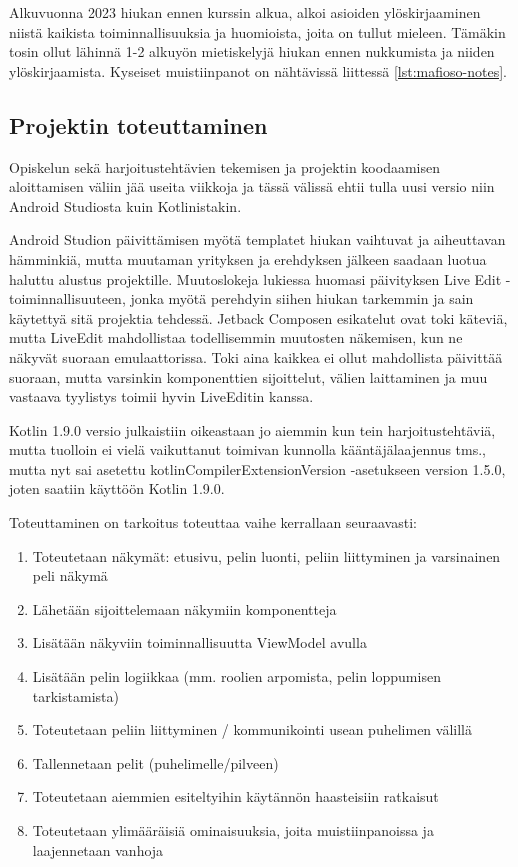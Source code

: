Alkuvuonna 2023 hiukan ennen kurssin alkua, alkoi asioiden ylöskirjaaminen
niistä kaikista toiminnallisuuksia ja huomioista, joita on tullut mieleen.
Tämäkin tosin ollut lähinnä 1-2 alkuyön mietiskelyjä hiukan ennen
nukkumista ja niiden ylöskirjaamista. Kyseiset muistiinpanot on nähtävissä
liittessä \ref{lst:mafioso-notes}.

\subsection{Projektin toteuttaminen}

Opiskelun sekä harjoitustehtävien tekemisen ja projektin koodaamisen
aloittamisen väliin jää useita viikkoja ja tässä välissä ehtii tulla uusi
versio niin Android Studiosta kuin Kotlinistakin.

Android Studion päivittämisen myötä templatet hiukan vaihtuvat
\parencite{AndroidStudioFlamingoReleaseNotes} ja aiheuttavan hämminkiä, mutta
muutaman yrityksen ja erehdyksen jälkeen saadaan luotua haluttu alustus
projektille. Muutoslokeja lukiessa huomasi päivityksen Live Edit
-toiminnallisuuteen, jonka myötä perehdyin siihen hiukan tarkemmin ja sain
käytettyä sitä projektia tehdessä. Jetback Composen esikatelut ovat toki
käteviä, mutta LiveEdit mahdollistaa todellisemmin muutosten näkemisen, kun ne
näkyvät suoraan emulaattorissa. Toki aina kaikkea ei ollut mahdollista
päivittää suoraan, mutta varsinkin komponenttien sijoittelut, välien
laittaminen ja muu vastaava tyylistys toimii hyvin LiveEditin kanssa.

Kotlin 1.9.0 versio julkaistiin oikeastaan jo aiemmin kun tein
harjoitustehtäviä, mutta tuolloin ei vielä vaikuttanut toimivan kunnolla
kääntäjälaajennus tms., mutta nyt sai asetettu kotlinCompilerExtensionVersion
-asetukseen version 1.5.0, joten saatiin käyttöön Kotlin 1.9.0.

Toteuttaminen on tarkoitus toteuttaa vaihe kerrallaan seuraavasti:
\begin{enumerate}
    \item Toteutetaan näkymät: etusivu, pelin luonti, peliin liittyminen ja
          varsinainen peli näkymä
    \item Lähetään sijoittelemaan näkymiin komponentteja
    \item Lisätään näkyviin toiminnallisuutta ViewModel avulla
    \item Lisätään pelin logiikkaa (mm. roolien arpomista, pelin loppumisen
          tarkistamista)
    \item Toteutetaan peliin liittyminen / kommunikointi usean puhelimen
          välillä
    \item Tallennetaan pelit (puhelimelle/pilveen)
    \item Toteutetaan aiemmien esiteltyihin käytännön haasteisiin ratkaisut
    \item Toteutetaan ylimääräisiä ominaisuuksia, joita muistiinpanoissa ja
          laajennetaan vanhoja
\end{enumerate}

